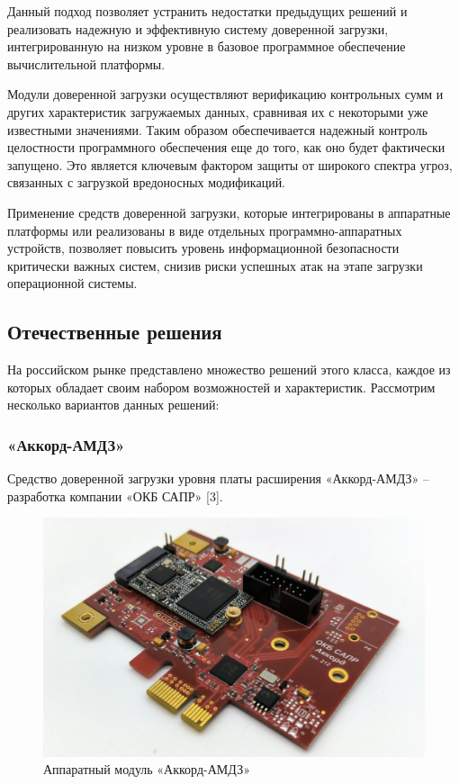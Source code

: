 Данный подход позволяет устранить недостатки предыдущих решений и реализовать надежную и эффективную систему доверенной загрузки, интегрированную на низком уровне в базовое программное обеспечение вычислительной платформы.

Модули доверенной загрузки осуществляют верификацию контрольных сумм и других 
характеристик загружаемых данных, сравнивая их с некоторыми уже известными значениями. Таким образом обеспечивается надежный контроль целостности 
программного обеспечения еще до того, как оно будет фактически запущено. Это 
является ключевым фактором защиты от широкого спектра угроз, связанных с загрузкой 
вредоносных модификаций.

Применение средств доверенной загрузки, которые интегрированы в аппаратные платформы или
реализованы в виде отдельных программно-аппаратных устройств, позволяет повысить
уровень информационной безопасности критически важных систем, снизив риски успешных 
атак на этапе загрузки операционной системы.


\newpage
\subsection{Отечественные решения}
На российском рынке представлено множество решений этого класса, каждое из которых
обладает своим набором возможностей и характеристик. Рассмотрим несколько вариантов данных решений:

\subsubsection{«Аккорд-АМДЗ»}
Средство доверенной загрузки уровня платы расширения «Аккорд-АМДЗ» – разработка 
компании «ОКБ САПР» [3]. 

\begin{figure}[H]
  \centering
  \includegraphics[width=1\textwidth]{pict/17}
  \caption{Аппаратный модуль «Аккорд-АМДЗ»}
  \label{fig:60}
\end{figure}


